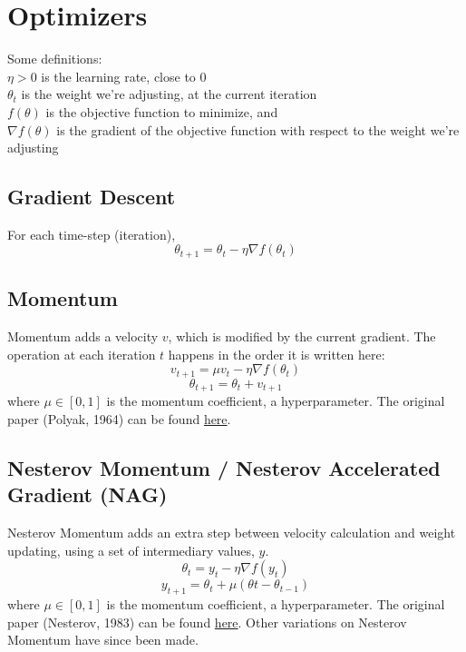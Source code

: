 \documentclass[fleqn]{article}
\begin{document}
\section{Optimizers}
Some definitions: \\
\hspace*{6mm} $\eta > 0$ is the learning rate, close to 0 \\
\hspace*{6mm} $\theta_t$ is the weight we're adjusting, at the current
	iteration \\
\hspace*{6mm} $f(\theta)$ is the objective function to minimize, and \\
\hspace*{6mm} $\nabla f(\theta)$ is the gradient of the objective function
	with respect to the weight we're adjusting

\subsection{Gradient Descent}
For each time-step (iteration),
\[ \theta_{t+1} = \theta_t - \eta \nabla f(\theta_t) \]

\subsection{Momentum}
Momentum adds a velocity $v$, which is modified by the current gradient.
The operation at each iteration $t$ happens in the order it is written
here:
\[ v_{t+1} = \mu v_t - \eta \nabla f(\theta_t) \]
\[ \theta_{t+1} = \theta_t + v_{t+1} \]
where $\mu \in [0, 1]$ is the momentum coefficient, a hyperparameter. The
original paper (Polyak, 1964) can be found 
\href{https://www.researchgate.net/publication/243648538_Some_methods_of_speeding_up_the_convergence_of_iteration_methods}
{here}.

\subsection{Nesterov Momentum / Nesterov Accelerated\\Gradient (NAG)}
Nesterov Momentum adds an extra step between velocity calculation and
weight updating, using a set of intermediary values, $y$.
\[ \theta_{t} = y_t - \eta \nabla f (y_t) \]
\[ y_{t+1} = \theta_{t} + \mu(\theta{t} - \theta_{t-1}) \]
where $\mu \in [0, 1]$ is the momentum coefficient, a hyperparameter. The
original paper (Nesterov, 1983) can be found
\href{http://www.cis.pku.edu.cn/faculty/vision/zlin/1983-A%20Method%20of%20Solving%20a%20Convex%20Programming%20Problem%20with%20Convergence%20Rate%20O(k%5E(-2))_Nesterov.pdf}
{here}. Other variations on Nesterov Momentum have since been made.
\end{document}

